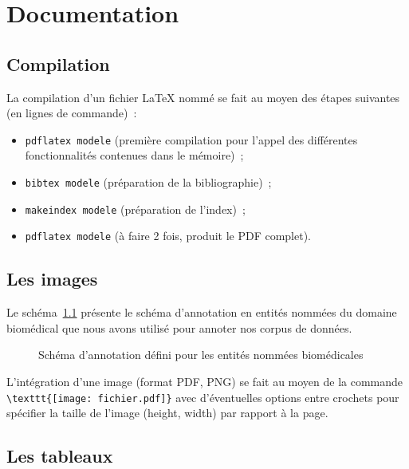 \documentclass{report}
\begin{document}
\chapter{Documentation}

\section{Compilation}
\label{sec:compilation}
La compilation d'un fichier \LaTeX{} nommé %
se fait au moyen des étapes suivantes (en lignes de commande)~:
%
\begin{itemize}
\item \verb+pdflatex modele+ (première compilation pour l'appel des différentes fonctionnalités contenues dans le mémoire)~;
\item \verb+bibtex modele+ (préparation de la bibliographie)~;
\item \verb+makeindex modele+ (préparation de l'index)~;
\item \verb+pdflatex modele+ (à faire 2 fois, produit le PDF complet).
\end{itemize}




\section{Les images}
\label{sec:images}

Le  schéma~\ref{fig:schema} présente le schéma
d'annotation en entités nommées du domaine biomédical que nous avons
utilisé pour annoter nos corpus de données.
%
\begin{figure}[h]
  \centering
  \caption{Schéma d'annotation défini pour les entités nommées
    biomédicales}
  \label{fig:schema}
\end{figure}

L'intégration d'une image (format PDF, PNG) se fait au moyen de la
commande \verb+\texttt{[image: fichier.pdf]}+ avec d'éventuelles
options entre crochets pour spécifier la taille de l'image (height,
width) par rapport à la page.



\newpage
\section{Les tableaux}
\label{sec:tableaux}
\end{document}
